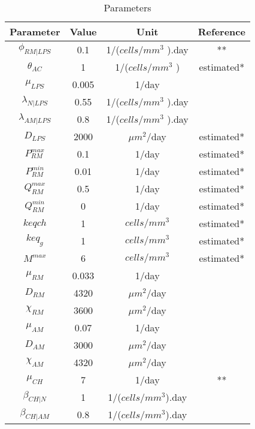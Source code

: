 \documentclass[10pt]{bmc_article}
\newenvironment{bmcformat}{\baselineskip20pt\sloppy\setboolean{publ}{false}}{\baselineskip20pt\sloppy}
\begin{document}
\begin{bmcformat}
\begin{table}[htpb]
\centering
\caption{Parameters}
\begin{tabular}{cccc}
\hline
\textbf{Parameter} & \textbf{Value} & \textbf{Unit}  & \textbf{Reference} \\
\hline 
$\phi_{RM|LPS}$ & 0.1 &  1/($cells/mm^3$ ).day & \cite{localmodel}**\\
\hline
$\theta_{AC}$ & 1 &  1/($cells/mm^3$ ) & estimated*\\
\hline 
$\mu_{LPS}$ & 0.005 & 1/day & \cite{localmodel}\\
\hline
$\lambda_{N|LPS}$ & 0.55 & 1/($cells/mm^3$ ).day & \cite{localmodel}\\
\hline 
$\lambda_{AM|LPS}$ & 0.8 & 1/($cells/mm^3$ ).day &\cite{localmodel} \\
\hline
$D_{LPS}$ & 2000 & ${\mu m}^2$/day & estimated*\\ 
\hline
$P^{max}_{RM}$ & 0.1 & 1/day & estimated*\\
\hline 
$P^{min}_{RM}$ & 0.01 & 1/day & estimated*\\
\hline 
$Q^{max}_{RM}$ & 0.5 & 1/day & estimated*\\
\hline 
$Q^{min}_{RM}$ & 0 & 1/day & estimated*\\
\hline 
$keqch$ & 1 &  $cells/mm^3$ & estimated*\\
\hline 
$keq_g$ & 1 &  $cells/mm^3$ & estimated*\\
\hline 
$M^{max}$ & 6 &  $cells/mm^3$ & estimated*\\
\hline 
$\mu_{RM}$ & 0.033 & 1/day & \cite{localmodel}\\
\hline 
$D_{RM}$ & 4320 & ${\mu m}^2$/day & \cite{Gammack2004,Owen97} \\
\hline 
$\chi_{RM}$ & 3600 & ${\mu m}^2$/day & \cite{Lauffenburger1993,Sozzani1991,Tranquillo1990} \\
\hline 
$\mu_{AM}$ & 0.07 & 1/day & \cite{localmodel}\\
\hline 
$D_{AM}$ & 3000 & ${\mu m}^2$/day & \cite{Gammack2004,Owen97} \\
\hline 
$\chi_{AM}$ & 4320 & ${\mu m}^2$/day & \cite{Lauffenburger1993,Sozzani1991,Tranquillo1990} \\
\hline
$\mu_{CH}$ & 7 & 1/day & \cite{localmodel}**\\
\hline 
$\beta_{CH|N}$ & 1 & 1/($cells/mm^3$).day & \cite{Andoh2000}\\
\hline 
$\beta_{CH|AM}$ & 0.8 & 1/($cells/mm^3$).day & \cite{Andoh2000}\\
\hline 

\end{tabular}
\end{table}
\end{bmcformat}
\end{document}
